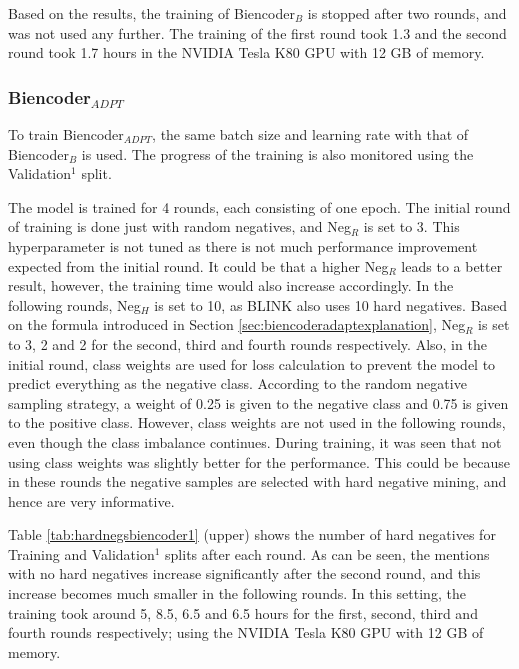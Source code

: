 \documentclass{report}
\theoremstyle{definition}
\theoremstyle{remark}
\begin{document}
Based on the results, the training of Biencoder$_B$ is stopped after two rounds, and was not used any further. The training of the first round took 1.3 and the second round took 1.7 hours in the NVIDIA Tesla K80 GPU with 12 GB of memory.
\subsubsection{Biencoder$_{ADPT}$}
To train Biencoder$_{ADPT}$, the same batch size and learning rate with that of Biencoder$_{B}$ is used. The progress of the training is also monitored using the Validation$^1$ split. 

The model is trained for 4 rounds, each consisting of one epoch. The initial round of training is done just with random negatives, and Neg$_R$ is set to 3. This hyperparameter is not tuned as there is not much performance improvement expected from the initial round. It could be that a higher Neg$_R$ leads to a better result, however, the training time would also increase accordingly. In the following rounds, Neg$_H$ is set to 10, as BLINK also uses 10 hard negatives. Based on the formula introduced in Section \ref{sec:biencoderadaptexplanation}, Neg$_R$ is set to 3, 2 and 2 for the second, third and fourth rounds respectively. Also, in the initial round, class weights are used for loss calculation to prevent the model to predict everything as the negative class. According to the random negative sampling strategy, a weight of 0.25 is given to the negative class and 0.75 is given to the positive class. However, class weights are not used in the following rounds, even though the class imbalance continues. During training, it was seen that not using class weights was slightly better for the performance. This could be because in these rounds the negative samples are selected with hard negative mining, and hence are very informative.

Table \ref{tab:hardnegsbiencoder1} (upper) shows the number of hard negatives for Training and Validation$^1$ splits after each round. As can be seen, the mentions with no hard negatives increase significantly after the second round, and this increase becomes much smaller in the following rounds. In this setting, the training took around 5, 8.5, 6.5 and 6.5 hours for the first, second, third and fourth rounds respectively; using the NVIDIA Tesla K80 GPU with 12 GB of memory.
\end{document}
